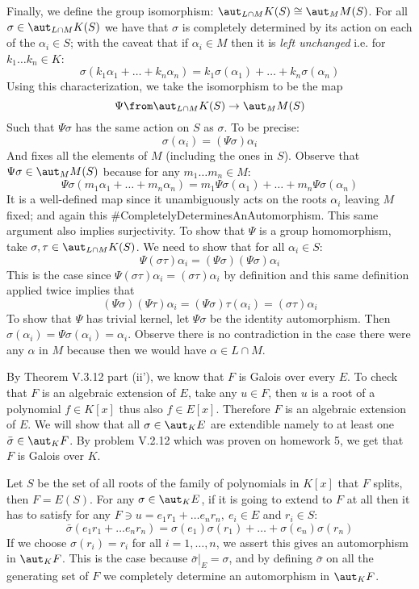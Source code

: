 Finally, we define the group isomorphism: $\aut_{L\cap M} K(S) \cong \aut_MM(S)$. 
For all $\sigma \in \aut_{L\cap M} K(S)$ we have that $\sigma$ is completely determined by its action on each of the $\alpha_i \in S$; with the caveat that if $\alpha_i \in M$ then it is \emph{left unchanged} i.e. for $k_1\ldots k_n \in K$:
$$\sigma(k_1 \alpha_1+\ldots + k_n \alpha_n) = k_1 \sigma(\alpha_1)+\ldots +  k_n \sigma(\alpha_n)$$
Using this characterization, we take the isomorphism to be the map 
$$\Psi \from \aut_{L\cap M} K(S) \to \aut_MM(S)$$
Such that  $\Psi\sigma$ has the same action on $S$ as $\sigma$. To be precise:
$$\sigma(\alpha_i)=(\Psi\sigma)\alpha_i$$
And fixes all the elements of $M$ (including the ones in $S$). Observe that $\Psi\sigma\in \aut_MM(S)$ because for any $m_1\ldots m_n \in M$:
$$\Psi\sigma(m_1 \alpha_1+\ldots + m_n \alpha_n) = m_1 \Psi\sigma(\alpha_1)+\ldots +  m_n \Psi\sigma(\alpha_n)$$
It is a well-defined map since it unambiguously acts on the roots $\alpha_i$ leaving $M$ fixed; and again this \#CompletelyDeterminesAnAutomorphism.
This same argument also implies surjectivity.
To show that $\Psi$ is a group homomorphism, take $\sigma, \tau\in   \aut_{L\cap M} K(S)$. We need to show that for all $\alpha_i \in S$:
$$\Psi(\sigma \tau)\alpha_i= (\Psi\sigma)(\Psi\sigma)\alpha_i$$   
This is the case since $\Psi(\sigma \tau)\alpha_i =(\sigma\tau)\alpha_i$ by definition and this same definition applied twice implies that 
$$(\Psi\sigma)(\Psi\tau)\alpha_i=(\Psi\sigma)\tau (\alpha_i)=(\sigma\tau)\alpha_i$$
To show that $\Psi$ has trivial kernel, let $\Psi\sigma$ be the identity automorphism. 
Then $\sigma(\alpha_i)=\Psi\sigma(\alpha_i) = \alpha_i$. 
Observe there is no contradiction in the case there were any $\alpha$ in $M$ because then we would have $\alpha\in L\cap M$.


By Theorem V.3.12 part (ii'), we know that $F$ is Galois over every $E$. To check that $F$ is an algebraic extension of $E$, take any $u\in F$, then $u$ is a root of a polynomial  $f\in K[x]$ thus also  $f\in E[x]$. Therefore $F$ is an algebraic extension of $E$.
We will show that all $\sigma\in \aut_KE$ are extendible namely to at least one $\bar\sigma \in \aut_K F$. By problem V.2.12 which was proven on homework 5, we get that $F$ is Galois over $K$.

Let $S$ be the set of all roots of the family of polynomials in $K[x]$ that $F$ splits, then $F=E(S)$. 
For any $\sigma\in \aut_KE$, if it is going to extend to $F$ at all then it has to satisfy for any $F\ni u=e_1 r_1 + \ldots e_n r_n,\ e_i\in E$ and $r_i\in S$:
$$\bar \sigma(e_1 r_1 + \ldots e_n r_n)=\sigma(e_1) \sigma(r_1) + \ldots +\sigma(e_n) \sigma(r_n)$$
If we choose $\sigma(r_i)=r_i$ for all $i=1,\ldots,n$, we assert this gives an automorphism in $\aut_KF$. 
This is the case because $\bar\sigma|_E=\sigma$, and by defining $\bar \sigma$ on all the generating set of $F$ we completely determine an automorphism in $\aut_K F$.

